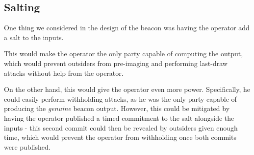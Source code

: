 \subsection{Salting}

One thing we considered in the design of the beacon was having the operator add a salt to the inputs.

This would make the operator the only party capable of computing the output, which would prevent outsiders from pre-imaging and performing last-draw attacks without help from the operator.

On the other hand, this would give the operator even more power. Specifically, he could easily perform withholding attacks, as he was the only party capable of producing the \textit{genuine} beacon output. However, this could be mitigated by having the operator published a timed commitment to the salt alongside the inputs - this second commit could then be revealed by outsiders given enough time, which would prevent the operator from withholding once both commits were published.